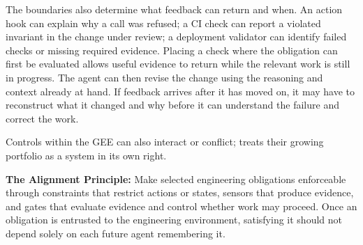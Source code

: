 



The boundaries also determine what feedback can return and when. An action hook can explain why a call was refused; a CI check can report a violated invariant in the change under review; a deployment validator can identify failed checks or missing required evidence. Placing a check where the obligation can first be evaluated allows useful evidence to return while the relevant work is still in progress. The agent can then revise the change using the reasoning and context already at hand. If feedback arrives after it has moved on, it may have to reconstruct what it changed and why before it can understand the failure and correct the work.


Controls within the GEE can also interact or conflict;  treats their growing portfolio as a system in its own right.


\textbf{The Alignment Principle:} Make selected engineering obligations enforceable through constraints that restrict actions or states, sensors that produce evidence, and gates that evaluate evidence and control whether work may proceed. Once an obligation is entrusted to the engineering environment, satisfying it should not depend solely on each future agent remembering it.

